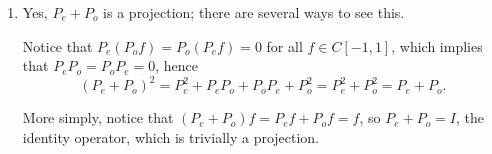 {\begin{solution}
\begin{enumerate}
\item Yes, $P_e + P_o$ is a projection; there are several ways to see this.

      Notice that $P_e (P_o f) = P_o (P_e f) = 0$ 
      for all $f \in C[-1,1]$,  which implies that $P_e P_o = P_o P_e = 0$, hence
  \[ (P_e + P_o)^2 = P_e^2 + P_e P_o + P_o P_e + P_o^2 = P_e^2 + P_o^2 = P_e + P_o.\]
      
      More simply, notice that $(P_e + P_o)f = P_e f + P_o f = f$, so $P_e + P_o = I$, the
      identity operator, which is trivially a projection.
\end{enumerate}
\end{solution}}{}
